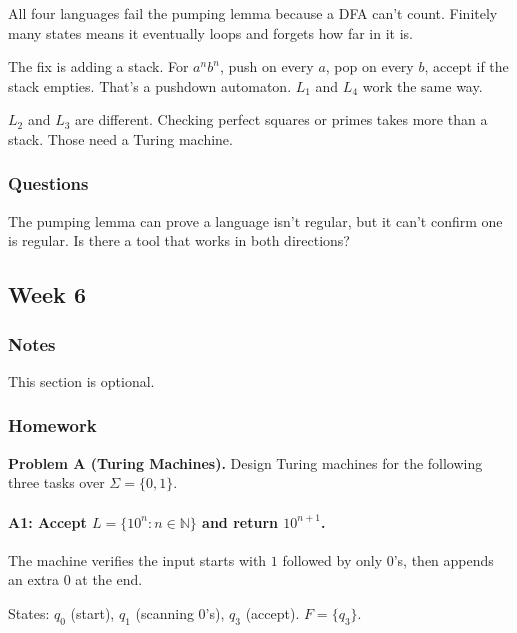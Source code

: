 \documentclass{article}
\theoremstyle{theorem}
\theoremstyle{definition}
\theoremstyle{remark}
\begin{document}
All four languages fail the pumping lemma because a DFA can't count. Finitely many states means it eventually loops and forgets how far in it is.

The fix is adding a stack. For $a^n b^n$, push on every $a$, pop on every $b$, accept if the stack empties. That's a pushdown automaton. $L_1$ and $L_4$ work the same way.

$L_2$ and $L_3$ are different. Checking perfect squares or primes takes more than a stack. Those need a Turing machine.

\subsubsection{Questions}

The pumping lemma can prove a language isn't regular, but it can't confirm one is regular. Is there a tool that works in both directions?















\subsection{Week 6}

\subsubsection{Notes}

This section is optional. 

\subsubsection{Homework}

\textbf{Problem A (Turing Machines).}
Design Turing machines for the following three tasks over $\Sigma = \{0,1\}$.

\paragraph{A1: Accept $L = \{10^n : n \in \mathbb{N}\}$ and return $10^{n+1}$.}

The machine verifies the input starts with $1$ followed by only $0$'s, then appends an extra $0$ at the end.

States: $q_0$ (start), $q_1$ (scanning $0$'s), $q_3$ (accept). $F = \{q_3\}$.
\end{document}
